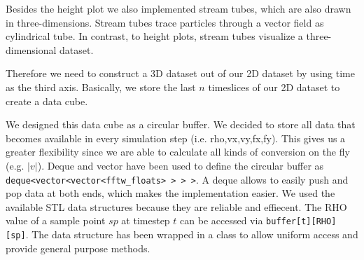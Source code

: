 Besides the height plot we also implemented stream tubes, which are also drawn in three-dimensions. Stream tubes trace particles through a vector field as cylindrical tube. In contrast, to  height plots, stream tubes visualize a three-dimensional dataset. 

Therefore we need to construct a 3D dataset out of our 2D dataset by using time as the third axis. Basically, we store the last $n$ timeslices of our 2D dataset to create a data cube. 

We designed this data cube as a circular buffer. We decided to store all data that becomes available in every simulation step (i.e. rho,vx,vy,fx,fy). This gives us a greater flexibility since we are able to calculate all kinds of conversion on the fly (e.g. $|v|$).  
Deque and vector have been used to define the circular buffer as \verb| deque<vector<vector<fftw_floats> > > >|.  A deque  allows to easily push and pop data at both ends, which makes the implementation easier. 
We used the available STL data structures because they are reliable and effiecent.
The RHO value of a sample point $sp$  at timestep $t$ can be accessed via  \verb|buffer[t][RHO][sp]|. The data structure has been wrapped in a class to allow uniform access and provide general purpose methods. 



